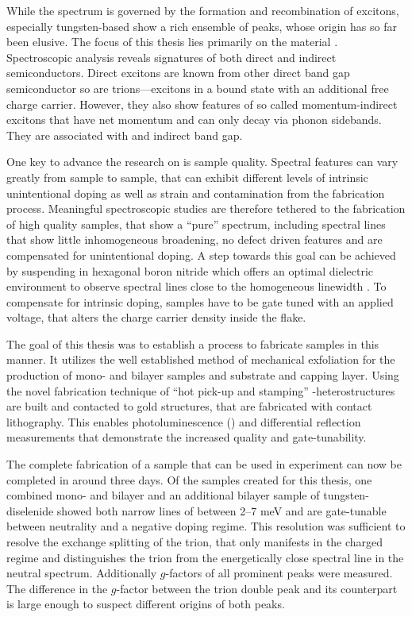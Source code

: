 While the spectrum is governed by the formation and recombination of excitons, especially tungsten-based \tmds show a rich ensemble of peaks, whose origin has so far been elusive. The focus of this thesis lies primarily on the material \wse\!. Spectroscopic analysis reveals signatures of both direct and indirect semiconductors. Direct excitons are known from other direct band gap semiconductor so are trions---excitons in a bound state with an additional free charge carrier. However, they also show features of so called momentum-indirect excitons that have net momentum and can only decay via phonon sidebands. They are associated with and indirect band gap.

One key to advance the research on \tmds is sample quality. Spectral features can vary greatly from sample to sample, that can exhibit different levels of intrinsic unintentional doping as well as strain and contamination from the fabrication process. Meaningful spectroscopic studies are therefore tethered to the fabrication of high quality samples, that show a ``pure'' spectrum, including spectral lines that show little inhomogeneous broadening, no defect driven features and are compensated for unintentional doping. A step towards this goal can be achieved by suspending \tmds in hexagonal boron nitride which offers an optimal dielectric environment to observe spectral lines close to the homogeneous linewidth \cite{dean_boron_2010,cadiz_excitonic_2017}. To compensate for intrinsic doping, samples have to be gate tuned with an applied voltage, that alters the charge carrier density inside the flake.

The goal of this thesis was to establish a process to fabricate samples in this manner. It utilizes the well established method of mechanical exfoliation for the production of \tmdg mono- and bilayer samples and \hbng substrate and capping layer. Using the novel fabrication technique of ``hot pick-up and stamping'' \hbn-\tmdg heterostructures are built and contacted to gold structures, that are fabricated with contact lithography. This enables photoluminescence (\pl) and differential reflection measurements that demonstrate the increased quality and gate-tunability.

The complete fabrication of a sample that can be used in experiment can now be completed in around three days. Of the samples created for this thesis, one combined mono- and bilayer and an additional bilayer sample of tungsten-diselenide showed both narrow lines of between 2--7 meV and are gate-tunable between neutrality and a negative doping regime. This resolution was sufficient to resolve the exchange splitting of the trion, that only manifests in the charged regime and distinguishes the trion from the energetically close spectral line in the neutral spectrum. Additionally $g$-factors of all prominent peaks were measured. The difference in the $g$-factor between the trion double peak and its counterpart is large enough to suspect different origins of both peaks. 

